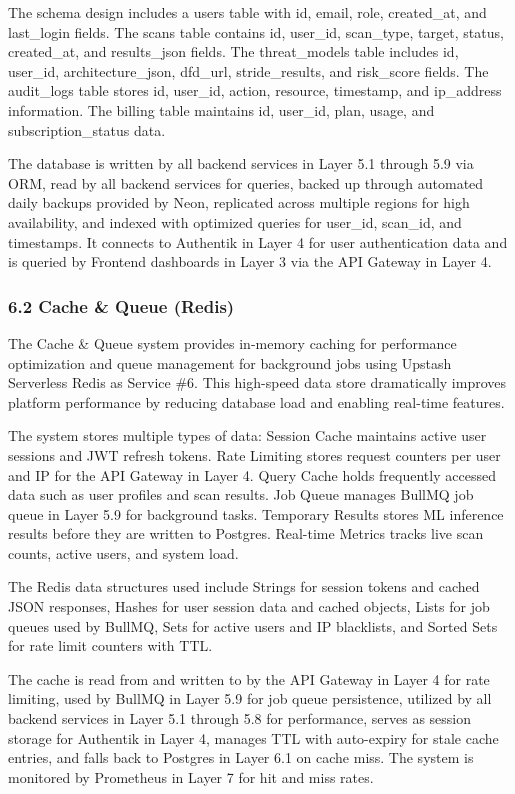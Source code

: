 \documentclass[12pt,a4paper]{report}
\begin{document}
The schema design includes a users table with id, email, role, created\_at, and last\_login fields. The scans table contains id, user\_id, scan\_type, target, status, created\_at, and results\_json fields. The threat\_models table includes id, user\_id, architecture\_json, dfd\_url, stride\_results, and risk\_score fields. The audit\_logs table stores id, user\_id, action, resource, timestamp, and ip\_address information. The billing table maintains id, user\_id, plan, usage, and subscription\_status data.

The database is written by all backend services in Layer 5.1 through 5.9 via ORM, read by all backend services for queries, backed up through automated daily backups provided by Neon, replicated across multiple regions for high availability, and indexed with optimized queries for user\_id, scan\_id, and timestamps. It connects to Authentik in Layer 4 for user authentication data and is queried by Frontend dashboards in Layer 3 via the API Gateway in Layer 4.

\subsubsection{6.2 Cache \& Queue (Redis)}

The Cache \& Queue system provides in-memory caching for performance optimization and queue management for background jobs using Upstash Serverless Redis as Service \#6. This high-speed data store dramatically improves platform performance by reducing database load and enabling real-time features.

The system stores multiple types of data: Session Cache maintains active user sessions and JWT refresh tokens. Rate Limiting stores request counters per user and IP for the API Gateway in Layer 4. Query Cache holds frequently accessed data such as user profiles and scan results. Job Queue manages BullMQ job queue in Layer 5.9 for background tasks. Temporary Results stores ML inference results before they are written to Postgres. Real-time Metrics tracks live scan counts, active users, and system load.

The Redis data structures used include Strings for session tokens and cached JSON responses, Hashes for user session data and cached objects, Lists for job queues used by BullMQ, Sets for active users and IP blacklists, and Sorted Sets for rate limit counters with TTL.

The cache is read from and written to by the API Gateway in Layer 4 for rate limiting, used by BullMQ in Layer 5.9 for job queue persistence, utilized by all backend services in Layer 5.1 through 5.8 for performance, serves as session storage for Authentik in Layer 4, manages TTL with auto-expiry for stale cache entries, and falls back to Postgres in Layer 6.1 on cache miss. The system is monitored by Prometheus in Layer 7 for hit and miss rates.
\end{document}
